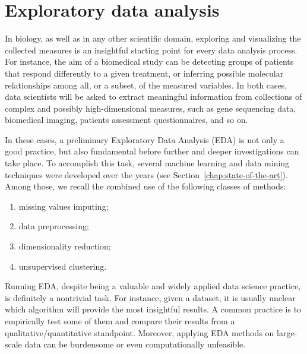 \section{Exploratory data analysis} \label{sec:data_exploration}

In biology, as well as in any other scientific domain, exploring and visualizing the collected measures is an insightful starting point for every data analysis process.
For instance, the aim of a biomedical study can be detecting groups of patients that respond differently to a given treatment, or inferring possible molecular relationships among all, or a subset, of the measured variables.
In both cases, data scientists will be asked to extract meaningful information from collections of complex and possibly high-dimensional measures, such as gene sequencing data, biomedical imaging, patients assessment questionnaires, and so on.

In these cases, a preliminary Exploratory Data Analysis (\ac{EDA}) is not only a good practice, but also fundamental before further and deeper investigations can take place.
To accomplish this task, several machine learning and data mining techniques were developed over the years (see Section~\ref{chap:state-of-the-art}).
Among those, we recall the combined use of the following classes of methods:
\begin{enumerate}
  \item missing values imputing;
  \item data preprocessing;
  \item dimensionality reduction;
  \item unsupervised clustering.
\end{enumerate}

Running EDA, despite being a valuable and widely applied data science practice, is definitely a nontrivial task.
For instance, given a dataset, it is usually unclear which algorithm will provide the most insightful results. A common practice is to empirically test some of them and compare their results from a qualitative/quantitative standpoint.
Moreover, applying EDA methods on large-scale data can be burdensome or even computationally unfeasible.


